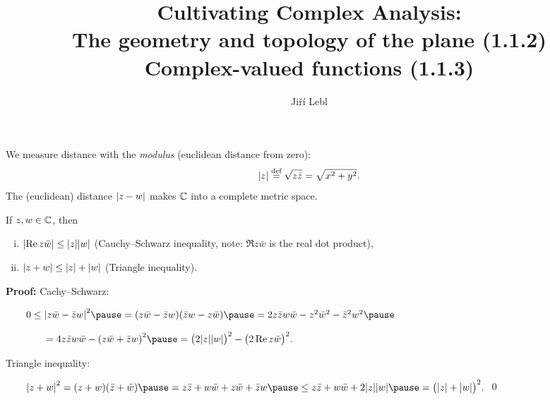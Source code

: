 \documentclass[10pt,aspectratio=169]{beamer}
\author{Ji\v{r}\'i Lebl}
\institute[OSU]{%
Departemento pri Matematiko de Oklahoma {\^S}tata Universitato}
\title{Cultivating Complex Analysis:\\%
The geometry and topology of the plane (1.1.2)\\%
Complex-valued functions (1.1.3)}
\date{}
\begin{document}
\begin{frame}
\titlepage
\end{frame}

\begin{frame}
We measure distance with the \emph{modulus} (euclidean distance from zero):
\[
\lvert {z} \rvert \overset{\text{def}}{=} \sqrt{z \bar{z}} = \sqrt{x^2+y^2} .
\]
\pause
The (euclidean) distance 
\(
\lvert {z-w} \rvert
\)
makes ${\mathbb{C}}$ into a complete metric space.

\medskip
\pause

\begin{proposition}
If $z,w \in {\mathbb{C}}$, then
\begin{enumerate}[(i)]
\item
$\lvert {\operatorname{Re}z\bar{w}} \rvert \leq \lvert {z} \rvert \lvert {w} \rvert$ \quad (Cauchy--Schwarz inequality, note: $\Re z
\bar{w}$ is the real dot product),
\pause
\item
$\lvert {z+w} \rvert \leq \lvert {z} \rvert + \lvert {w} \rvert$ \quad (Triangle inequality).
\end{enumerate}
\end{proposition}

\pause

\textbf{Proof:}
Cachy--Schwarz:

\medskip

\(
\qquad
0  \leq {\sabs{z\bar{w}-\bar{z}w}}^2 \pause
   =    (z\bar{w}-\bar{z}w)(\bar{z}w-z\bar{w})  \pause
   =    2z\bar{z}w\bar{w} - z^2\bar{w}^2 - \bar{z}^2w^2 \pause
\)

\( \qquad \qquad
   =    4z\bar{z}w\bar{w} - {(z\bar{w}+\bar{z}w)}^2 \pause
   =    {\bigl(2\sabs{z}\sabs{w}\bigr)}^2 - {\bigl(2 \Re z\bar{w}\bigr)}^2 .
\)

\medskip
\pause

Triangle inequality:

\medskip
\(
\qquad
{\sabs{z+w}}^2  =    (z+w)(\bar{z}+\bar{w}) \pause
                =    z\bar{z} + w\bar{w} + z\bar{w} + \bar{z}w \pause
                \leq z\bar{z} + w\bar{w} + 2 \sabs{z}\sabs{w} \pause
                =    {\bigl(\sabs{z}+\sabs{w}\bigr)}^2 .
\) \qed

\end{frame}
\end{document}
